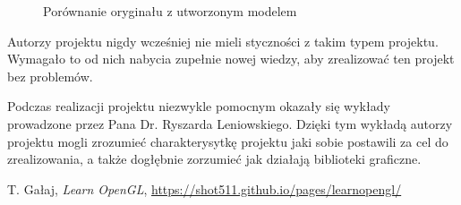 \documentclass[a4paper,12pt]{article}
\numberwithin{equation}{section}
\begin{document}
\begin{figure}[h!]
    \centering
    \caption{Porównanie oryginału z utworzonym modelem}
    \label{fig:furgon}
\end{figure}

Autorzy projektu nigdy wcześniej nie mieli styczności z takim typem projektu. Wymagało to od nich nabycia zupełnie nowej wiedzy, aby zrealizować ten projekt bez problemów.

Podczas realizacji projektu niezwykle pomocnym okazały się wykłady prowadzone przez Pana Dr. Ryszarda Leniowskiego. Dzięki tym wykładą autorzy projektu mogli zrozumieć charakterysytkę projektu jaki sobie postawili za cel do zrealizowania, a także dogłębnie zorzumieć jak działają biblioteki graficzne.



\begin{thebibliography}{9}
     T. Gałaj, \emph{Learn OpenGL}, \href{https://shot511.github.io/pages/learnopengl/}{https://shot511.github.io/pages/learnopengl/}
\end{thebibliography}
\end{document}
